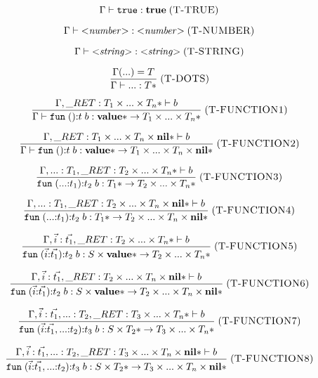 \documentclass[12pt]{article}
\newcommand{\Top}{\mathbf{value}}
\newcommand{\Nil}{\mathbf{nil}}
\newcommand{\True}{\mathbf{true}}
\newcommand{\kw}[1]{\mathbf{\texttt{#1}}}
\newcommand{\mylabel}[1]{\; (\textsc{#1})}
\newcommand{\env}{\Gamma}
\newcommand{\ret}{\string_RET}
\begin{document}
\[
\env \vdash \kw{true} : \True
\mylabel{T-TRUE}
\]

\[
\env \vdash {<}{\it number}{>} : {<}{\it number}{>}
\mylabel{T-NUMBER}
\]

\[
\env \vdash {<}{\it string}{>} : {<}{\it string}{>}
\mylabel{T-STRING}
\]

\[
\frac{\env({...}) = T}
     {\env \vdash {...} : T{*}}
\mylabel{T-DOTS}
\]

\[
\frac{\env, \ret:T_{1} \times ... \times T_{n}* \vdash b}
     {\env \vdash \kw{fun} \; (){:}t \; b :
      \Top{*} \rightarrow T_{1} \times ... \times T_{n}*}
\mylabel{T-FUNCTION1}
\]

\[
\frac{\env, \ret:T_{1} \times ... \times T_{n} \times \Nil{*} \vdash b}
     {\env \vdash \kw{fun} \; (){:}t \; b :
      \Top{*} \rightarrow T_{1} \times ... \times T_{n} \times \Nil{*}}
\mylabel{T-FUNCTION2}
\]

\[
\frac{\env, {...}:T_{1}, \ret:T_{2} \times ... \times T_{n}* \vdash b}
     {\kw{fun} \; ({...}{:}t_{1}){:}t_{2} \; b :
      T_{1}{*} \rightarrow T_{2} \times ... \times T_{n}*}
\mylabel{T-FUNCTION3}
\]

\[
\frac{\env, {...}:T_{1}, \ret:T_{2} \times ... \times T_{n} \times \Nil{*} \vdash b}
     {\kw{fun} \; ({...}{:}t_{1}){:}t_{2} \; b :
      T_{1}{*} \rightarrow T_{2} \times ... \times T_{n} \times \Nil{*}}
\mylabel{T-FUNCTION4}
\]

\[
\frac{\env, \vec{i}:\vec{t_{1}},
      \ret:T_{2} \times ... \times T_{n}* \vdash b}
     {\kw{fun} \; (\vec{i}{:}\vec{t_{1}}){:}t_{2} \; b :
      S \times \Top{*} \rightarrow T_{2} \times ... \times T_{n}*}
\mylabel{T-FUNCTION5}
\]

\[
\frac{\env, \vec{i}:\vec{t_{1}},
      \ret:T_{2} \times ... \times T_{n} \times \Nil{*} \vdash b}
     {\kw{fun} \; (\vec{i}{:}\vec{t_{1}}){:}t_{2} \; b :
      S \times \Top{*} \rightarrow T_{2} \times ... \times T_{n} \times \Nil{*}}
\mylabel{T-FUNCTION6}
\]

\[
\frac{\env, \vec{i}:\vec{t_{1}}, {...}:T_{2},
      \ret:T_{3} \times ... \times T_{n}* \vdash b}
     {\kw{fun} \; (\vec{i}{:}\vec{t_{1}},{...}{:}t_{2}){:}t_{3} \; b :
      S \times T_{2}* \rightarrow T_{3} \times ... \times T_{n}*}
\mylabel{T-FUNCTION7}
\]

\[
\frac{\env, \vec{i}:\vec{t_{1}}, {...}:T_{2},
      \ret:T_{3} \times ... \times T_{n} \times \Nil{*} \vdash b}
     {\kw{fun} \; (\vec{i}{:}\vec{t_{1}},{...}{:}t_{2}){:}t_{3} \; b :
      S \times T_{2}* \rightarrow T_{3} \times ... \times T_{n} \times \Nil{*}}
\mylabel{T-FUNCTION8}
\]
\end{document}
